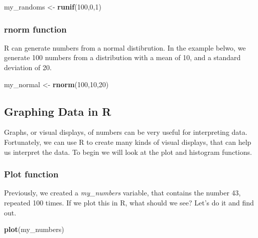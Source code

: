 \documentclass[]{book}
\newenvironment{Shaded}{\begin{snugshade}}{\end{snugshade}}
\newcommand{\KeywordTok}[1]{\textcolor[rgb]{0.13,0.29,0.53}{\textbf{{#1}}}}
\newcommand{\DecValTok}[1]{\textcolor[rgb]{0.00,0.00,0.81}{{#1}}}
\newcommand{\StringTok}[1]{\textcolor[rgb]{0.31,0.60,0.02}{{#1}}}
\newcommand{\NormalTok}[1]{{#1}}
\theoremstyle{definition}
\theoremstyle{definition}
\theoremstyle{definition}
\theoremstyle{remark}
\begin{document}
\begin{Shaded}
\begin{Highlighting}[]
\NormalTok{my_randoms <-}\StringTok{ }\KeywordTok{runif}\NormalTok{(}\DecValTok{100}\NormalTok{,}\DecValTok{0}\NormalTok{,}\DecValTok{1}\NormalTok{)}
\end{Highlighting}
\end{Shaded}

\subsubsection{rnorm function}\label{rnorm-function}

R can generate numbers from a normal distibrution. In the example belwo,
we generate 100 numbers from a distribution with a mean of 10, and a
standard deviation of 20.

\begin{Shaded}
\begin{Highlighting}[]
\NormalTok{my_normal <-}\StringTok{ }\KeywordTok{rnorm}\NormalTok{(}\DecValTok{100}\NormalTok{,}\DecValTok{10}\NormalTok{,}\DecValTok{20}\NormalTok{)}
\end{Highlighting}
\end{Shaded}

\subsection{Graphing Data in R}\label{graphing-data-in-r}

Graphs, or visual displays, of numbers can be very useful for
interpreting data. Fortunately, we can use R to create many kinds of
visual displays, that can help us interpret the data. To begin we will
look at the plot and histogram functions.

\subsubsection{Plot function}\label{plot-function}

Previously, we created a \emph{my\_numbers} variable, that contains the
number 43, repeated 100 times. If we plot this in R, what should we see?
Let's do it and find out.

\begin{Shaded}
\begin{Highlighting}[]
\KeywordTok{plot}\NormalTok{(my_numbers)}
\end{Highlighting}
\end{Shaded}
\end{document}
